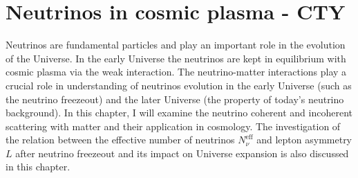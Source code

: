 \section{Neutrinos in cosmic plasma - CTY}\label{Neutrino}
Neutrinos are fundamental particles and play an important role in the evolution of the Universe. In the early Universe the neutrinos are kept in equilibrium with cosmic plasma via the weak interaction. The neutrino-matter interactions play a crucial role in  understanding of neutrinos evolution in the early Universe (such as the neutrino freezeout) and the later Universe (the property of today's neutrino background). In this chapter, I will examine the neutrino coherent and incoherent scattering with matter and their application in cosmology. The investigation of the relation between the effective number of neutrinos $N^{\mathrm{eff}}_\nu$ and lepton asymmetry $L$ after neutrino freezeout and its impact on Universe expansion is also discussed in this chapter. 



